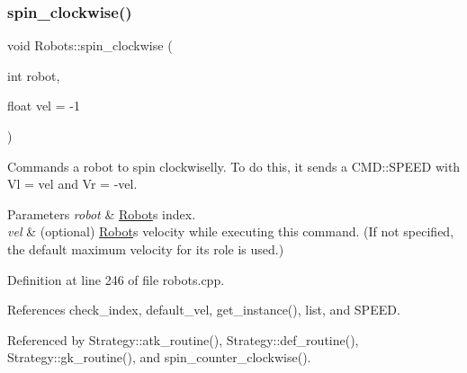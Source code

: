 \subsubsection{\texorpdfstring{spin\+\_\+clockwise()}{spin\_clockwise()}}
{\footnotesize\ttfamily void Robots\+::spin\+\_\+clockwise (\begin{DoxyParamCaption}\item[{int}]{robot,  }\item[{float}]{vel = {\ttfamily -\/1} }\end{DoxyParamCaption})\hspace{0.3cm}{\ttfamily [static]}}

Commands a robot to spin clockwiselly. To do this, it sends a C\+M\+D\+::\+S\+P\+E\+ED with Vl = vel and Vr = -\/vel. 
\begin{DoxyParams}{Parameters}
{\em robot} & \hyperlink{struct_robots_1_1_robot}{Robot}\textquotesingle{}s index. \\
\hline
{\em vel} & (optional) \hyperlink{struct_robots_1_1_robot}{Robot}\textquotesingle{}s velocity while executing this command. (If not specified, the default maximum velocity for it\textquotesingle{}s role is used.) \\
\hline
\end{DoxyParams}


Definition at line 246 of file robots.\+cpp.



References check\+\_\+index, default\+\_\+vel, get\+\_\+instance(), list, and S\+P\+E\+ED.



Referenced by Strategy\+::atk\+\_\+routine(), Strategy\+::def\+\_\+routine(), Strategy\+::gk\+\_\+routine(), and spin\+\_\+counter\+\_\+clockwise().


